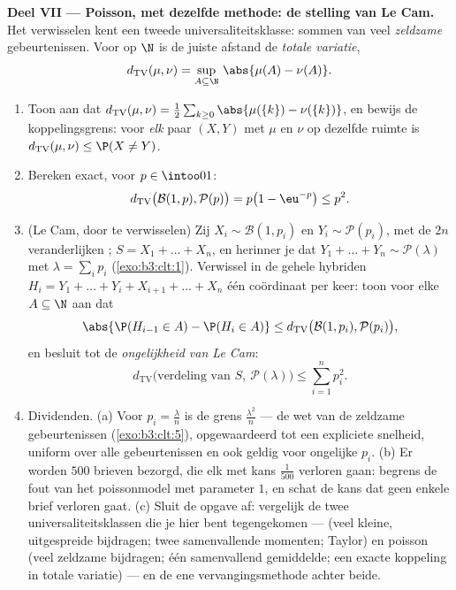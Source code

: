 \begin{problem}
\medskip
\noindent\textbf{Deel VII --- Poisson, met dezelfde methode: de
stelling van Le Cam.} Het verwisselen kent een tweede
universaliteitsklasse: sommen van veel 
\emph{zeldzame} gebeurtenissen. Voor  op $\N$ is de
juiste afstand de \emph{totale variatie},
\[
d_{\mathrm{TV}}(\mu, \nu) = \sup_{A\subseteq\N}\,
\abs{\mu(A) - \nu(A)} .
\]
\begin{enumerate}[resume]
  \item Toon aan dat $d_{\mathrm{TV}}(\mu, \nu) =
        \frac12\sum_{k\geq0}\abs{\mu(\{k\}) - \nu(\{k\})}$, en
        bewijs de koppelingsgrens: voor \emph{elk} paar $(X, Y)$
         met  $\mu$ en $\nu$ op
        dezelfde ruimte is $d_{\mathrm{TV}}(\mu, \nu) \leq \P(X
        \neq Y)$.
  \item Bereken exact, voor $p \in \intoo01$:
        \[
        d_{\mathrm{TV}}\bigl(\mathcal B(1, p), \mathcal
        P(p)\bigr) = p\bigl(1 - \eu^{-p}\bigr) \leq p^2 .
        \]
  \item (Le Cam, door te verwisselen) Zij $X_i \sim \mathcal B(1,
        p_i)$ en $Y_i \sim \mathcal P(p_i)$, met de $2n$
        veranderlijken ; $S = X_1 + \dots + X_n$, en
        herinner je dat $Y_1 + \dots + Y_n \sim \mathcal
        P(\lambda)$ met $\lambda = \sum_ip_i$
        (\cref{exo:b3:clt:1}). Verwissel in de gehele hybriden
        $H_i = Y_1 + \dots + Y_i + X_{i+1} + \dots + X_n$ één
        coördinaat per keer: toon voor elke $A \subseteq \N$ aan
        dat
        \[
        \abs{\P(H_{i-1} \in A) - \P(H_i \in A)} \leq
        d_{\mathrm{TV}}\bigl(\mathcal B(1, p_i), \mathcal
        P(p_i)\bigr),
        \]
        en besluit tot de \emph{ongelijkheid van Le Cam}:
        \[
        d_{\mathrm{TV}}\bigl(\text{verdeling van } S,\ \mathcal
        P(\lambda)\bigr) \leq \sum_{i=1}^np_i^2 .
        \]
  \item Dividenden. (a) Voor $p_i = \frac\lambda n$ is de grens
        $\frac{\lambda^2}n$ --- de wet van de zeldzame
        gebeurtenissen (\cref{exo:b3:clt:5}), opgewaardeerd tot
        een expliciete snelheid, uniform over alle gebeurtenissen
        en ook geldig voor ongelijke $p_i$. (b) Er worden $500$
        brieven bezorgd, die elk  met kans
        $\frac1{500}$ verloren gaan: begrens de fout van het
        poissonmodel met parameter $1$, en schat de kans dat geen
        enkele brief verloren gaat. (c) Sluit de opgave af:
        vergelijk de twee universaliteitsklassen die je hier bent
        tegengekomen ---  (veel kleine, uitgespreide
        bijdragen; twee samenvallende momenten; Taylor) en
        poisson (veel zeldzame bijdragen; één samenvallend
        gemiddelde; een exacte koppeling in totale variatie) ---
        en de ene vervangingsmethode achter beide.


\end{enumerate}
\end{problem}
